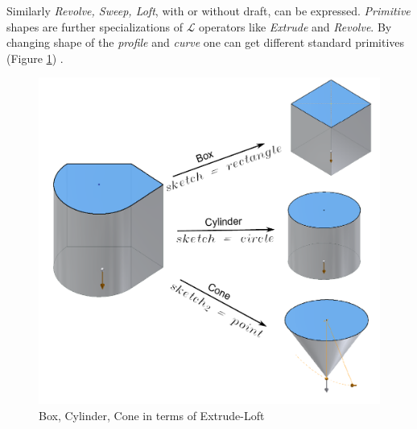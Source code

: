 Similarly {\em Revolve, Sweep, Loft}, with or without draft, can be expressed. {\em Primitive} shapes are further specializations of {\bf $\mathcal{L}$} operators like {\em Extrude} and {\em Revolve}. By changing shape of the {\em profile} and {\em curve} one can get different standard primitives  (Figure \ref{figure_ExtrudeBoxCylCone}) .

\begin{figure}[htbp]
	\includegraphics[scale=0.35]{../Common/images//ExtrudeBoxCylCone.pdf} 
\caption{Box, Cylinder, Cone in terms of Extrude-Loft}
\label{figure_ExtrudeBoxCylCone}
\end{figure}
%

